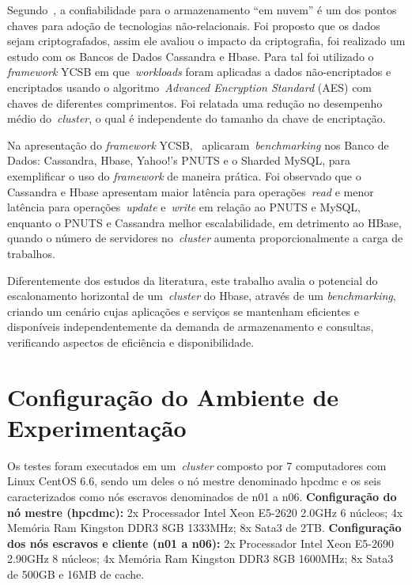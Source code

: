 \documentclass[12pt]{article}
\begin{document}
Segundo~\cite{waage2014benchmarking}, a confiabilidade para o armazenamento ``em nuvem'' é um dos pontos chaves para adoção de tecnologias não-relacionais. 
Foi proposto que os dados sejam criptografados, assim ele avaliou o impacto da criptografia, foi realizado um estudo com os Bancos de Dados Cassandra e Hbase. 
Para tal foi utilizado o \emph{framework} YCSB em que~\emph{workloads} foram aplicadas a dados não-encriptados e encriptados usando o algoritmo~\emph{Advanced Encryption Standard} (AES) com chaves de diferentes comprimentos. 
Foi relatada uma redução no desempenho médio do~\emph{cluster}, o qual é independente do tamanho da chave de encriptação.

Na apresentação do \textit{framework} YCSB,~\cite{cooper2010benchmarking} aplicaram~\emph{benchmarking} nos Banco de Dados: Cassandra, Hbase, Yahoo!’s PNUTS e o Sharded MySQL, para exemplificar o uso do \textit{framework} de maneira prática. 
Foi observado que o Cassandra e Hbase apresentam maior latência para operações~\emph{read} e menor latência para operações~\emph{update} e~\emph{write} em relação ao PNUTS e MySQL, enquanto o PNUTS e Cassandra melhor escalabilidade, em detrimento ao HBase, quando o número de servidores no~\emph{cluster} aumenta proporcionalmente a carga de trabalhos.

Diferentemente dos estudos da literatura, este trabalho avalia o potencial do escalonamento horizontal de um~\emph{cluster} do Hbase, através de um \textit{benchmarking}, criando um cenário cujas aplicações e serviços se mantenham eficientes e disponíveis independentemente da demanda de armazenamento e consultas, verificando aspectos de eficiência e disponibilidade.

\section{Configuração do Ambiente de Experimentação}
\label{sec:conf-experimento}

Os testes foram executados em um~\emph{cluster} composto por 7 computadores com Linux CentOS 6.6, sendo um deles o nó mestre denominado hpcdmc e os seis caracterizados como nós escravos denominados de n01 a n06. \textbf{Configuração do nó mestre (hpcdmc):} 2x Processador Intel Xeon E5-2620 2.0GHz 6 núcleos; 4x Memória Ram Kingston DDR3 8GB 1333MHz; 8x Sata3 de 2TB. \textbf{Configuração dos nós escravos e cliente (n01 a n06):} 2x Processador Intel Xeon E5-2690 2.90GHz 8 núcleos; 4x Memória Ram Kingston DDR3 8GB 1600MHz; 8x Sata3 de 500GB e 16MB de cache.
\end{document}
